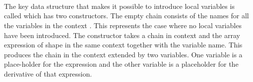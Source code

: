 {\begin{code}[hide]
\AgdaSymbol{)}\<%
\\
%
\>[2]\AgdaSpace{}%
\<%
\\
%
\>[2]\AgdaSpace{}%
\<%
\\
%
\>[2]\AgdaSpace{}%
\<%
\\
%
\>[2]\AgdaSpace{}%
\<%
\\
%
\>[2]\AgdaSpace{}%
\<%
\\
%
\\[\AgdaEmptyExtraSkip]%
%
\>[2]\AgdaSpace{}%
\AgdaSymbol{:}\AgdaSpace{}%
\AgdaSpace{}%
\AgdaSpace{}%
\<%
\\
%
\>[2]\AgdaSpace{}%
\AgdaSpace{}%
\AgdaSymbol{=}\AgdaSpace{}%
\AgdaSpace{}%
\AgdaSpace{}%
\<%
\end{code}

The key data structure that makes it possible to introduce local variables
is called  which has two constructors.  The empty chain consists
of the names for all the variables in the context .  This represents the
case where no local variables have been introduced.  The  constructor
takes a chain in context  and the array expression of shape  in
the same context together with the variable name.  This produces the chain
in the context extended by two variables.  One variable is a place-holder
for the expression and the other variable is a placeholder for the derivative
of that expression.
\begin{code}%
%
\>[2]\AgdaSpace{}%
\AgdaSpace{}%
\AgdaSymbol{:}\AgdaSpace{}%
\AgdaSpace{}%
\AgdaSpace{}%
\AgdaSpace{}%
\<%
\\
\>[2][@{}l@{\AgdaIndent{0}}]%
\>[4]%
\>[9]\AgdaSymbol{:}\AgdaSpace{}%
\AgdaSpace{}%
\AgdaSpace{}%
\AgdaSpace{}%
\AgdaSpace{}%
\<%
\\
%
\>[4]%
\>[9]\AgdaSymbol{:}\AgdaSpace{}%
\AgdaSpace{}%
\AgdaSpace{}%
\AgdaSpace{}%
\AgdaSymbol{(}\AgdaSpace{}%
\AgdaSpace{}%
\AgdaSpace{}%
\AgdaSpace{}%
\AgdaSymbol{(}\AgdaSpace{}%
\AgdaSymbol{))}\AgdaSpace{}%
\AgdaSpace{}%
\AgdaSpace{}%
\AgdaSymbol{(}\AgdaSpace{}%
\AgdaSpace{}%
\AgdaSpace{}%
\AgdaSpace{}%
\AgdaSpace{}%
\AgdaSpace{}%
\AgdaSymbol{)}\<%
\end{code}

}
